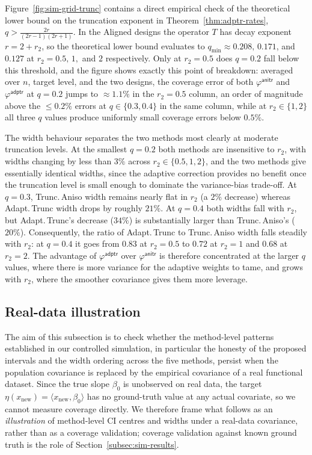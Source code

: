 \documentclass[11pt,a4paper]{article}
\theoremstyle{definition}
\theoremstyle{plain}
\theoremstyle{remark}
\newcommand{\anitr}{\mathsf{anitr}}
\newcommand{\adptr}{\mathsf{adptr}}
\begin{document}
Figure~\ref{fig:sim-grid-trunc} contains a direct empirical check of the theoretical lower bound on the truncation exponent in Theorem~\ref{thm:adptr-rates}, $q>\tfrac{2r}{(2r-1)(2r+1)}$. In the Aligned designs the operator $T$ has decay exponent $r=2+r_2$, so the theoretical lower bound evaluates to $q_{\min}\approx 0.208,\, 0.171$, and $0.127$ at $r_2=0.5,\,1,$ and $2$ respectively. Only at $r_2=0.5$ does $q=0.2$ fall below this threshold, and the figure shows exactly this point of breakdown: averaged over $n$, target level, and the two designs, the coverage error of both $\varphi^{\anitr}$ and $\varphi^{\adptr}$ at $q=0.2$ jumps to $\approx 1.1\%$ in the $r_2=0.5$ column, an order of magnitude above the $\le 0.2\%$ errors at $q\in\{0.3,0.4\}$ in the same column, while at $r_2\in\{1,2\}$ all three $q$ values produce uniformly small coverage errors below $0.5\%$.

The width behaviour separates the two methods most clearly at moderate truncation levels. At the smallest $q=0.2$ both methods are insensitive to $r_2$, with widths changing by less than $3\%$ across $r_2\in\{0.5,1,2\}$, and the two methods give essentially identical widths, since the adaptive correction provides no benefit once the truncation level is small enough to dominate the variance-bias trade-off. At $q=0.3$, Trunc.\,Aniso width remains nearly flat in $r_2$ (a $2\%$ decrease) whereas Adapt.\,Trunc width drops by roughly $21\%$. At $q=0.4$ both widths fall with $r_2$, but Adapt.\,Trunc's decrease ($34\%$) is substantially larger than Trunc.\,Aniso's ($20\%$). Consequently, the ratio of Adapt.\,Trunc to Trunc.\,Aniso width falls steadily with $r_2$: at $q=0.4$ it goes from $0.83$ at $r_2=0.5$ to $0.72$ at $r_2=1$ and $0.68$ at $r_2=2$. The advantage of $\varphi^{\adptr}$ over $\varphi^{\anitr}$ is therefore concentrated at the larger $q$ values, where there is more variance for the adaptive weights to tame, and grows with $r_2$, where the smoother covariance gives them more leverage.

\subsection{Real-data illustration}\label{subsec:sim-real-data}

The aim of this subsection is to check whether the method-level patterns established in our controlled simulation, in particular the honesty of the proposed intervals and the width ordering across the five methods, persist when the population covariance is replaced by the empirical covariance of a real functional dataset. Since the true slope $\beta_0$ is unobserved on real data, the target $\eta(x_{\text{new}}) = \langle x_{\text{new}}, \beta_0 \rangle$ has no ground-truth value at any actual covariate, so we cannot measure coverage directly. We therefore frame what follows as an \emph{illustration} of method-level CI centres and widths under a real-data covariance, rather than as a coverage validation; coverage validation against known ground truth is the role of Section~\ref{subsec:sim-results}.
\end{document}
